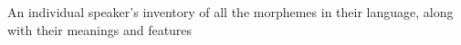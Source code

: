 An individual speaker's inventory of all the morphemes in their language, along with their meanings and features
